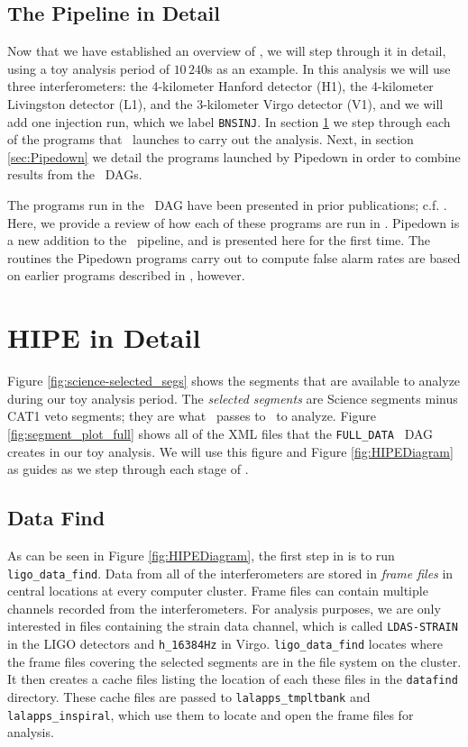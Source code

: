 \subsection{The Pipeline in Detail}

Now that we have established an overview of \ihope, we will step through it in
detail, using a toy analysis period of $10\,240$s as an example. In this
analysis we will use three interferometers: the 4-kilometer Hanford detector
(H1), the 4-kilometer Livingston detector (L1), and the 3-kilometer Virgo
detector (V1), and we will add one injection run, which we label
\texttt{BNSINJ}. In section \ref{sec:HIPEdetail} we step through each of the
programs that \hipe~launches to carry out the analysis. Next, in section
\ref{sec:Pipedown} we detail the programs launched by Pipedown in order to
combine results from the \hipe~\acp{DAG}.

The programs run in the \hipe~\ac{DAG} have been presented in prior
publications; c.f. \cite{brown-2005-22, Allen:2005fk, Robinson:2008,
Keppel:thesis}. Here, we provide a review of how each of these programs are run
in \ihope. Pipedown is a new addition to the \ihope~pipeline, and is presented
here for the first time. The routines the Pipedown programs carry out to
compute false alarm rates are based on earlier programs described in
\cite{Keppel:thesis}, however.

\section{HIPE in Detail}
\label{sec:HIPEdetail}

Figure \ref{fig:science-selected_segs} shows the segments that are available to
analyze during our toy analysis period. The \emph{selected segments} are
Science segments minus CAT1 veto segments; they are what \ihope~passes to
\hipe~to analyze. Figure \ref{fig:segment_plot_full} shows all of the XML files
that the \verb|FULL_DATA| \hipe~\ac{DAG} creates in our toy analysis. We will
use this figure and Figure \ref{fig:HIPEDiagram} as guides as we step through
each stage of \hipe. 

\subsection{Data Find}
\label{sec:data_find}

As can be seen in Figure \ref{fig:HIPEDiagram}, the first step in \hipe is to
run \texttt{ligo\_data\_find}. Data from all of the interferometers are stored
in \emph{frame files} in central locations at every computer cluster. Frame
files can contain multiple channels recorded from the interferometers. For
analysis purposes, we are only interested in files containing the strain data
channel, which is called \texttt{LDAS-STRAIN} in the \ac{LIGO} detectors and
\texttt{h\_16384Hz} in Virgo. \texttt{ligo\_data\_find} locates where the frame
files covering the selected segments are in the file system on the cluster. It
then creates a cache files listing the location of each these files in the
\texttt{datafind} directory. These cache files are passed to
\texttt{lalapps\_tmpltbank} and \texttt{lalapps\_inspiral}, which use them to
locate and open the frame files for analysis.

